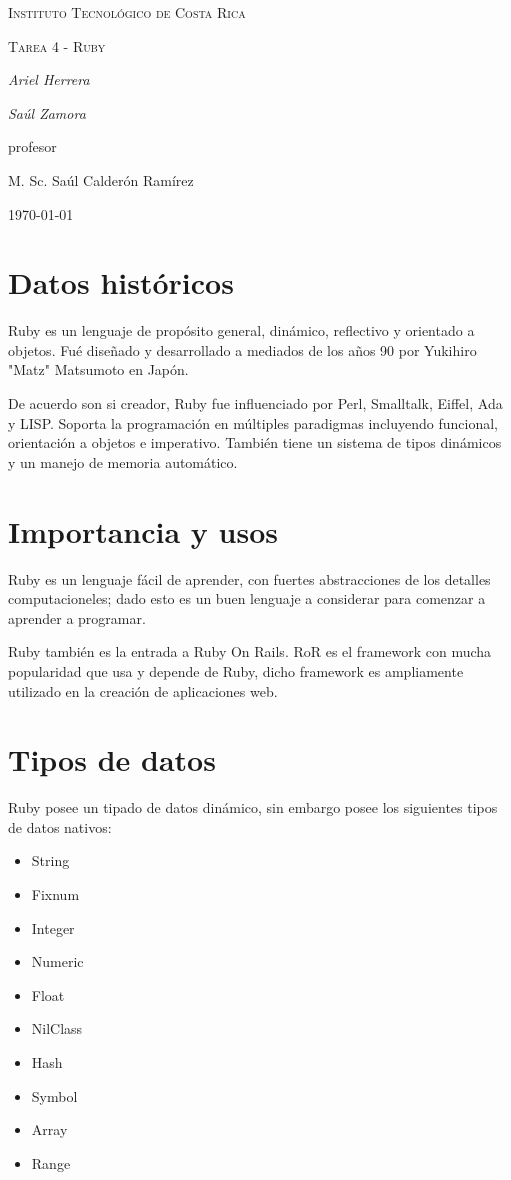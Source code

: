 \documentclass{IEEEtran}
\begin{document}
\begin{titlepage}
  \centering
  {\scshape\LARGE Instituto Tecnol\'ogico de Costa Rica \par}
  \vspace{1cm}
  {\scshape\Large Tarea 4 - Ruby\par}
  \vspace{1.5cm}
  {\Large\itshape Ariel Herrera\par}
  {\Large\itshape Sa\'ul Zamora\par}
  \vfill
  profesor\par
  M. Sc. Sa\'ul Calder\'on Ram\'irez \textsc{}

  \vfill

  {\large \today\par}
\end{titlepage}

\section{Datos hist\'oricos}
Ruby es un lenguaje de prop\'osito general, din\'amico, reflectivo y orientado a objetos. Fu\'e dise\~nado y desarrollado a mediados de los a\~nos 90 por Yukihiro "Matz" Matsumoto en Jap\'on.

De acuerdo son si creador, Ruby fue influenciado por Perl, Smalltalk, Eiffel, Ada y LISP. Soporta la programaci\'on en m\'ultiples paradigmas incluyendo funcional, orientaci\'on a objetos e imperativo. Tambi\'en tiene un sistema de tipos din\'amicos y un manejo de memoria autom\'atico.

\section{Importancia y usos}
Ruby es un lenguaje f\'acil de aprender, con fuertes abstracciones de los detalles computacioneles; dado esto es un buen lenguaje a considerar para comenzar a aprender a programar.

Ruby tambi\'en es la entrada a Ruby On Rails. RoR es el framework con mucha popularidad que usa y depende de Ruby, dicho framework es ampliamente utilizado en la creaci\'on de aplicaciones web.

\section{Tipos de datos}
Ruby posee un tipado de datos din\'amico, sin embargo posee los siguientes tipos de datos nativos:
\begin{itemize}
  \item String
  \item Fixnum
  \item Integer
  \item Numeric
  \item Float
  \item NilClass
  \item Hash
  \item Symbol
  \item Array
  \item Range
\end{itemize}
\end{document}
